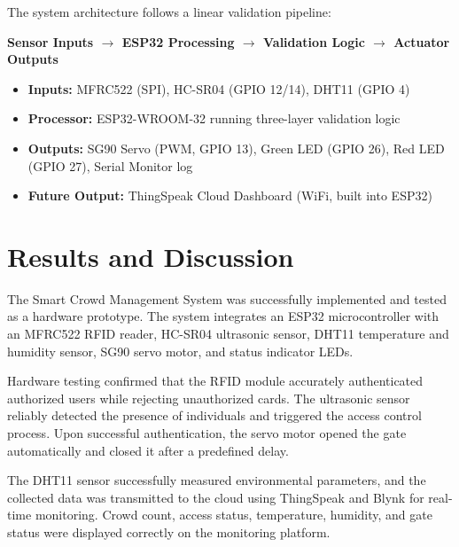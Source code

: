 \documentclass[12pt,a4paper]{report}
\begin{document}
{The system architecture follows a linear validation pipeline:

\begin{center}
\textbf{Sensor Inputs $\rightarrow$ ESP32 Processing $\rightarrow$ Validation Logic $\rightarrow$ Actuator Outputs}
\end{center}

\begin{itemize}[leftmargin=*]
    \item \textbf{Inputs:} MFRC522 (SPI), HC-SR04 (GPIO 12/14), DHT11 (GPIO 4)
    \item \textbf{Processor:} ESP32-WROOM-32 running three-layer validation logic
    \item \textbf{Outputs:} SG90 Servo (PWM, GPIO 13), Green LED (GPIO 26), Red LED (GPIO 27), Serial Monitor log
    \item \textbf{Future Output:} ThingSpeak Cloud Dashboard (WiFi, built into ESP32)
\end{itemize}

\FloatBarrier

\chapter{Results and Discussion}

The Smart Crowd Management System was successfully implemented and tested as a hardware prototype. The system integrates an ESP32 microcontroller with an MFRC522 RFID reader, HC-SR04 ultrasonic sensor, DHT11 temperature and humidity sensor, SG90 servo motor, and status indicator LEDs.

Hardware testing confirmed that the RFID module accurately authenticated authorized users while rejecting unauthorized cards. The ultrasonic sensor reliably detected the presence of individuals and triggered the access control process. Upon successful authentication, the servo motor opened the gate automatically and closed it after a predefined delay.

The DHT11 sensor successfully measured environmental parameters, and the collected data was transmitted to the cloud using ThingSpeak and Blynk for real-time monitoring. Crowd count, access status, temperature, humidity, and gate status were displayed correctly on the monitoring platform.

}
\end{document}
